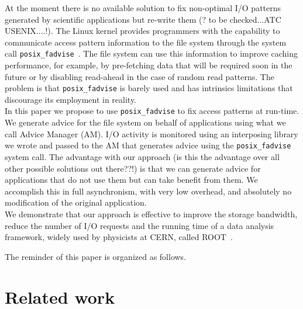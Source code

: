\documentclass[letterpaper,twocolumn,10pt]{article}
\begin{document}
At the moment there is no available solution to fix non-optimal I/O patterns generated by scientific applications but re-write them {\color{red} (? to be checked...ATC USENIX....!)}. The Linux kernel provides programmers with the capability to communicate access pattern information to the file system through the system call \texttt{posix\_fadvise}~\cite{AdviseAPI}. The file system can use this information to improve caching performance, for example, by pre-fetching data that will be required soon in the future or by disabling read-ahead in the case of random read patterns. The problem is that \texttt{posix\_fadvise} is barely used and has intrinsics limitations that discourage its employment in reality.\\
In this paper we propose to use \texttt{posix\_fadvise} to fix access patterns at run-time. We generate advice for the file system on behalf of applications using what we call Advice Manager (AM). I/O activity is monitored using an interposing library we wrote and passed to the AM that generates advice using the \texttt{posix\_fadvise} system call. The advantage with our approach {\color{red} (is this the advantage over all other possible solutions out there??!)} is that we can generate advice for applications that do not use them but can take benefit from them. We accomplish this in full asynchronism, with very low overhead, and absolutely no modification of the original application.\\
We demonstrate that our approach is effective to improve the storage bandwidth, reduce the number of I/O requests and the running time of a data analysis framework, widely used by physicists at CERN, called ROOT~\cite{ROOT}.

The reminder of this paper is organized as follows.

\section{Related work}

%
\end{document}
